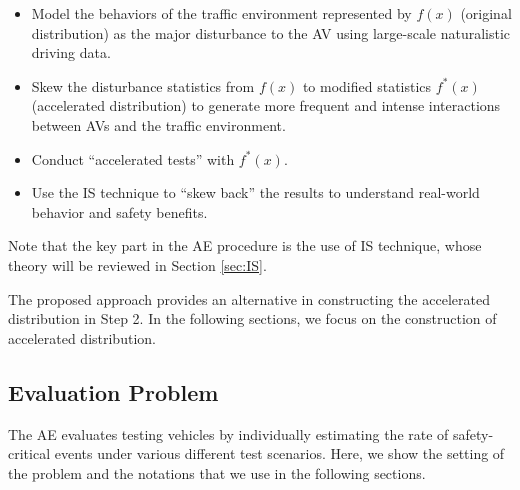\documentclass[letterpaper, 10 pt, journal]{IEEEtran}  %
\newcommand{\mansur}[1]{\textcolor{blue}{[Mansur: #1]}}
\begin{document}

\begin{itemize}
	\item Model the behaviors of the traffic environment represented by $f(x)$ (original distribution) as the major disturbance to the AV using large-scale naturalistic driving data.
	\item Skew the disturbance statistics from $f(x)$ to modified statistics $f^{*}(x)$ (accelerated distribution) to generate more frequent and intense interactions between AVs and the traffic environment.
	\item Conduct “accelerated tests” with $f^{*}(x)$. 
	\item Use the IS technique to “skew back” the results to understand real-world behavior and safety benefits.
\end{itemize}

Note that the key part in the AE procedure is the use of IS technique, whose theory will be reviewed in Section \ref{sec:IS}.


The proposed approach provides an alternative in constructing the accelerated distribution in Step 2. In the following sections, we focus on the construction of accelerated distribution. 

\subsection{Evaluation Problem}\label{sec:Problem}
The AE evaluates testing vehicles by individually estimating the rate of safety-critical events under various different test scenarios. Here, we show the setting of the problem and the notations that we use in the following sections.
\end{document}

